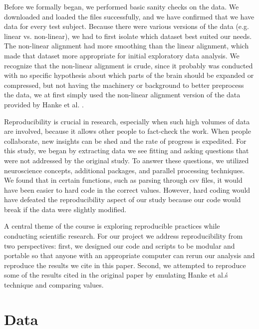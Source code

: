 Before we formally began, we performed basic sanity checks on the data. We
downloaded and loaded the files successfully, and we have confirmed that we
have data for every test subject. Because there were various versions of the
data (e.g. linear vs. non-linear), we had to first isolate which dataset best
suited our needs. The non-linear alignment had more smoothing than the linear
alignment, which made that dataset more appropriate for initial exploratory
data analysis.  We recognize that the non-linear alignment is crude, since it
probably was conducted with no specific hypothesis about which parts of the
brain should be expanded or compressed, but not having the machinery or
background to better preprocess the data, we at first simply used the non-linear
alignment version of the data provided by Hanke et al.
\cite{hank2014audiomovie}.

Reproducibility is crucial in research, especially when such high volumes of
data are involved, because it allows other people to fact-check the work. When
people collaborate, new insights can be shed and the rate of progress is
expedited. For this study, we began by extracting data we see fitting and
asking questions that were not addressed by the original study. To answer
these questions, we utilized neuroscience concepts, additional packages, and
parallel processing techniques. We found that in certain functions, such as
parsing through csv files, it would have been easier to hard code in the
correct values. However, hard coding would have defeated the reproducibility
aspect of our study because our code would break if the data were slightly
modified.

A central theme of the course is exploring reproducible practices while conducting scientific research. For our project we address reproducibility 
from two perspectives: first, we designed our code and scripts to be modular 
and portable so that anyone with an appropriate computer can rerun our analysis 
and reproduce the results we cite in this paper. Second, we attempted to reproduce 
some of the results cited in the original paper by emulating Hanke et al.\'s 
technique and comparing values. 

\section{Data}

